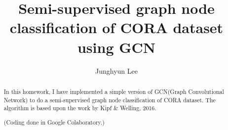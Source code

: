 \documentclass[a4paper, twoside]{report}
\title{Semi-supervised graph node classification of CORA dataset using GCN}
\author{Junghyun Lee}
\begin{document}


\begin{abstract}
In this homework, I have implemented a simple version of GCN(Graph Convolutional Network) to do a semi-supervised graph node classification of CORA dataset.
The algorithm is based upon the work by Kipf \& Welling, 2016.

(Coding done in Google Colaboratory.)
\end{abstract}
 
\tableofcontents
\listoffigures
\listoftables








\end{document}
